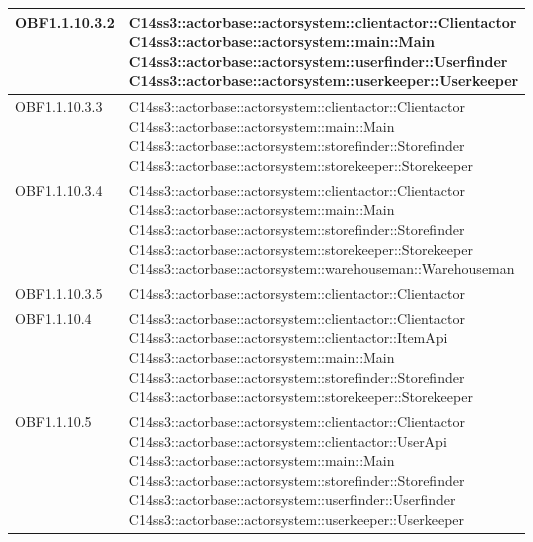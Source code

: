\documentclass{scalatekids-article}
\begin{document}
\begin{longtable}[H]{|p{4.5cm}|p{13cm}|}
\hline
OBF1.1.10.3.2 & \multiLineCell[t]{C14ss3::actorbase::actorsystem::clientactor::Clientactor\\C14ss3::actorbase::actorsystem::main::Main\\C14ss3::actorbase::actorsystem::userfinder::Userfinder\\C14ss3::actorbase::actorsystem::userkeeper::Userkeeper\\}\\
\hline
OBF1.1.10.3.3 & \multiLineCell[t]{C14ss3::actorbase::actorsystem::clientactor::Clientactor\\C14ss3::actorbase::actorsystem::main::Main\\C14ss3::actorbase::actorsystem::storefinder::Storefinder\\C14ss3::actorbase::actorsystem::storekeeper::Storekeeper\\}\\
\hline
OBF1.1.10.3.4 & \multiLineCell[t]{C14ss3::actorbase::actorsystem::clientactor::Clientactor\\C14ss3::actorbase::actorsystem::main::Main\\C14ss3::actorbase::actorsystem::storefinder::Storefinder\\C14ss3::actorbase::actorsystem::storekeeper::Storekeeper\\C14ss3::actorbase::actorsystem::warehouseman::Warehouseman\\}\\
\hline
OBF1.1.10.3.5 & \multiLineCell[t]{C14ss3::actorbase::actorsystem::clientactor::Clientactor\\}\\
\hline
OBF1.1.10.4 & \multiLineCell[t]{C14ss3::actorbase::actorsystem::clientactor::Clientactor\\C14ss3::actorbase::actorsystem::clientactor::ItemApi\\C14ss3::actorbase::actorsystem::main::Main\\C14ss3::actorbase::actorsystem::storefinder::Storefinder\\C14ss3::actorbase::actorsystem::storekeeper::Storekeeper\\}\\
\hline
OBF1.1.10.5 & \multiLineCell[t]{C14ss3::actorbase::actorsystem::clientactor::Clientactor\\C14ss3::actorbase::actorsystem::clientactor::UserApi\\C14ss3::actorbase::actorsystem::main::Main\\C14ss3::actorbase::actorsystem::storefinder::Storefinder\\C14ss3::actorbase::actorsystem::userfinder::Userfinder\\C14ss3::actorbase::actorsystem::userkeeper::Userkeeper\\}\\

\end{longtable}
\end{document}
